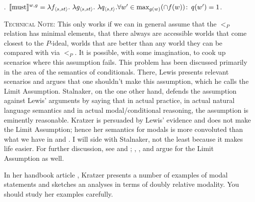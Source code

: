 \ex. $\sv{\mbox{must}}^{w,g} = \lambda f_{\angles{s,st}}.\ \lambda g_{\angles{s,st}}.\ \lambda q_{\angles{s,t}}.\\
\null\hfill \forall w' \in \mbox{max}_{g(w)} (\cap f(w))\co q(w') = 1$.

{\scshape Technical Note}: This only works if we can in general assume that the $<_P$ relation has minimal elements, that there always are accessible worlds that come closest to the $P$-ideal, worlds that are better than any world they can be compared with via $<_P$. It is possible, with some imagination, to cook up scenarios where this assumption fails. This problem has been discussed primarily in the area of the semantics of conditionals. There, Lewis presents relevant scenarios and argues that one shouldn't make this assumption, which he calls the Limit Assumption. Stalnaker, on the one other hand, defends the assumption against Lewis' arguments by saying that in actual practice, in actual natural language semantics and in actual modal/conditional reasoning, the assumption is eminently reasonable. Kratzer is persuaded by Lewis' evidence and does not make the Limit Assumption; hence her semantics for modals is more convoluted than what we have in \LLast and \Last. I will side with Stalnaker, not the least because it makes life easier. For further discussion, see \citet[19--21]{lewis:1973:counterfactuals} and \citet[Chapter 7, esp. pp. 140--142]{stalnaker:1984:inquiry}; \citet{pollock:1976:subjunctive}, \citet{herzberger:1979:consistency}, and \citet{warmbrod:1982:limit} argue for the Limit Assumption as well.

\begin{exercise}
	
	In her handbook article \cite{kratzer:1991:modality}, Kratzer presents a number of examples of modal statements and sketches an analyses in terms of doubly relative modality. You should study her examples carefully. \eex
\end{exercise}

